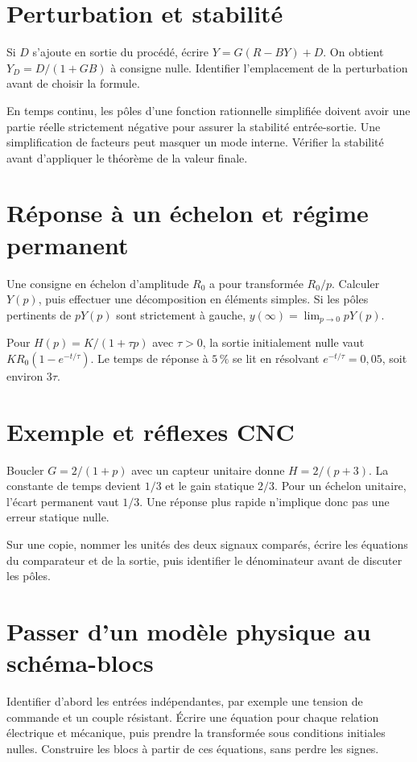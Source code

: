 \documentclass[11pt,a4paper]{article}
\begin{document}
\section*{Perturbation et stabilité}
Si $D$ s’ajoute en sortie du procédé, écrire $Y=G(R-BY)+D$. On obtient $Y_D=D/(1+GB)$ à consigne nulle. Identifier l’emplacement de la perturbation avant de choisir la formule.

En temps continu, les pôles d’une fonction rationnelle simplifiée doivent avoir une partie réelle strictement négative pour assurer la stabilité entrée-sortie. Une simplification de facteurs peut masquer un mode interne. Vérifier la stabilité avant d’appliquer le théorème de la valeur finale.

\section*{Réponse à un échelon et régime permanent}
Une consigne en échelon d’amplitude $R_0$ a pour transformée $R_0/p$. Calculer $Y(p)$, puis effectuer une décomposition en éléments simples. Si les pôles pertinents de $pY(p)$ sont strictement à gauche, $y(\infty)=\lim_{p\to0}pY(p)$.

Pour $H(p)=K/(1+\tau p)$ avec $\tau>0$, la sortie initialement nulle vaut $KR_0(1-e^{-t/\tau})$. Le temps de réponse à $5\,\%$ se lit en résolvant $e^{-t/\tau}=0{,}05$, soit environ $3\tau$.

\section*{Exemple et réflexes CNC}
Boucler $G=2/(1+p)$ avec un capteur unitaire donne $H=2/(p+3)$. La constante de temps devient $1/3$ et le gain statique $2/3$. Pour un échelon unitaire, l’écart permanent vaut $1/3$. Une réponse plus rapide n’implique donc pas une erreur statique nulle.

Sur une copie, nommer les unités des deux signaux comparés, écrire les équations du comparateur et de la sortie, puis identifier le dénominateur avant de discuter les pôles.

\section*{Passer d’un modèle physique au schéma-blocs}
Identifier d’abord les entrées indépendantes, par exemple une tension de commande et un couple résistant. Écrire une équation pour chaque relation électrique et mécanique, puis prendre la transformée sous conditions initiales nulles. Construire les blocs à partir de ces équations, sans perdre les signes.
\end{document}

